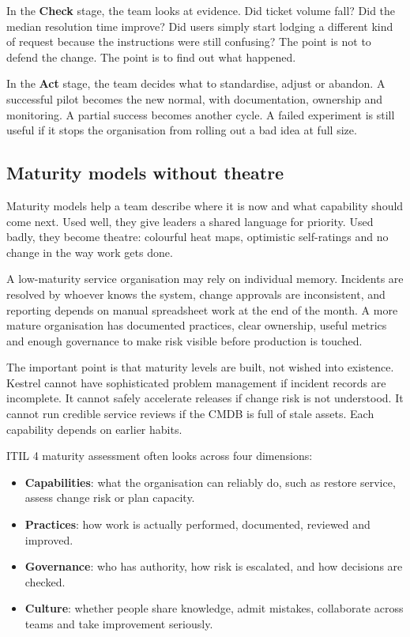 In the \textbf{Check} stage, the team looks at evidence. Did ticket volume fall? Did the median resolution time improve? Did users simply start lodging a different kind of request because the instructions were still confusing? The point is not to defend the change. The point is to find out what happened.


In the \textbf{Act} stage, the team decides what to standardise, adjust or abandon. A successful pilot becomes the new normal, with documentation, ownership and monitoring. A partial success becomes another cycle. A failed experiment is still useful if it stops the organisation from rolling out a bad idea at full size.



\subsection{Maturity models without theatre}


Maturity models help a team describe where it is now and what capability should come next. Used well, they give leaders a shared language for priority. Used badly, they become theatre: colourful heat maps, optimistic self-ratings and no change in the way work gets done.


A low-maturity service organisation may rely on individual memory. Incidents are resolved by whoever knows the system, change approvals are inconsistent, and reporting depends on manual spreadsheet work at the end of the month. A more mature organisation has documented practices, clear ownership, useful metrics and enough governance to make risk visible before production is touched.


The important point is that maturity levels are built, not wished into existence. Kestrel cannot have sophisticated problem management if incident records are incomplete. It cannot safely accelerate releases if change risk is not understood. It cannot run credible service reviews if the CMDB is full of stale assets. Each capability depends on earlier habits.


ITIL 4 maturity assessment often looks across four dimensions:


\begin{itemize}[leftmargin=*]
\item \textbf{Capabilities}: what the organisation can reliably do, such as restore service, assess change risk or plan capacity.
\item \textbf{Practices}: how work is actually performed, documented, reviewed and improved.
\item \textbf{Governance}: who has authority, how risk is escalated, and how decisions are checked.
\item \textbf{Culture}: whether people share knowledge, admit mistakes, collaborate across teams and take improvement seriously.
\end{itemize}

